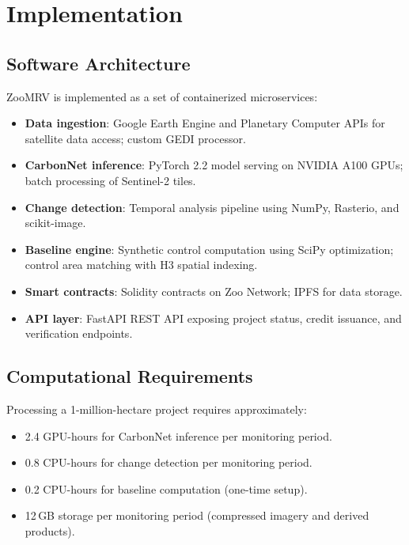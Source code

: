 \documentclass[11pt,a4paper]{article}
\begin{document}
\section{Implementation}
\label{sec:implementation}

\subsection{Software Architecture}

ZooMRV is implemented as a set of containerized microservices:

\begin{itemize}
  \item \textbf{Data ingestion}: Google Earth Engine and Planetary
    Computer APIs for satellite data access; custom GEDI processor.
  \item \textbf{CarbonNet inference}: PyTorch 2.2 model serving on
    NVIDIA A100 GPUs; batch processing of Sentinel-2 tiles.
  \item \textbf{Change detection}: Temporal analysis pipeline using
    NumPy, Rasterio, and scikit-image.
  \item \textbf{Baseline engine}: Synthetic control computation using
    SciPy optimization; control area matching with H3 spatial indexing.
  \item \textbf{Smart contracts}: Solidity contracts on Zoo Network;
    IPFS for data storage.
  \item \textbf{API layer}: FastAPI REST API exposing project status,
    credit issuance, and verification endpoints.
\end{itemize}

\subsection{Computational Requirements}

Processing a 1-million-hectare project requires approximately:
\begin{itemize}
  \item 2.4 GPU-hours for CarbonNet inference per monitoring period.
  \item 0.8 CPU-hours for change detection per monitoring period.
  \item 0.2 CPU-hours for baseline computation (one-time setup).
  \item 12\,GB storage per monitoring period (compressed imagery and
    derived products).
\end{itemize}
\end{document}
